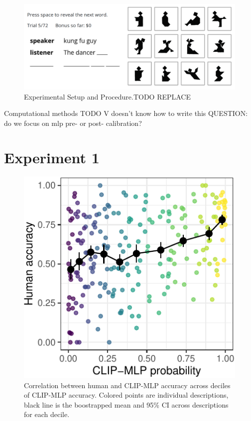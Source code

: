 \documentclass[10pt, letterpaper]{article}
\begin{document}
\begin{CodeChunk}
\begin{figure}[t!]

{\centering \includegraphics[width=1\linewidth]{matcher_diagram} 

}

\caption[Experimental Setup and Procedure.TODO REPLACE \label{game}]{Experimental Setup and Procedure.TODO REPLACE \label{game}}\label{fig:interface}
\end{figure}
\end{CodeChunk}

Computational methods TODO V doesn't know how to write this QUESTION: do
we focus on mlp pre- or post- calibration?

\section{Experiment 1}\label{experiment-1}

\begin{CodeChunk}
\begin{figure}[t]

{\centering \includegraphics[width=0.7\linewidth]{figs/fig-calibration-1} 

}

\caption[Correlation between human and CLIP-MLP accuracy across deciles of CLIP-MLP accuracy]{Correlation between human and CLIP-MLP accuracy across deciles of CLIP-MLP accuracy. Colored points are individual descriptions, black line is the boostrapped mean and 95\% CI across descriptions for each decile. \label{calibration}}\label{fig:fig-calibration}
\end{figure}
\end{CodeChunk}
\end{document}
